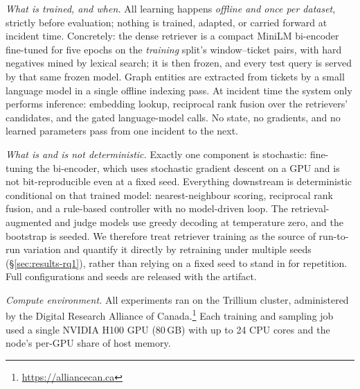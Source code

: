 \noindent\emph{What is trained, and when.} All learning happens \emph{offline and
once per dataset}, strictly before evaluation; nothing is trained, adapted, or
carried forward at incident time. Concretely: the dense retriever is a compact
MiniLM bi-encoder fine-tuned for five epochs on the \emph{training} split's
window--ticket pairs, with hard negatives mined by lexical search; it is then
frozen, and every test query is served by that same frozen model. Graph entities
are extracted from tickets by a small language model in a single offline indexing
pass. At incident time the system only performs inference: embedding lookup,
reciprocal rank fusion over the retrievers' candidates, and the gated
language-model calls. No state, no gradients, and no learned parameters pass from
one incident to the next.

\noindent\emph{What is and is not deterministic.} Exactly one component is
stochastic: fine-tuning the bi-encoder, which uses stochastic gradient descent on
a GPU and is not bit-reproducible even at a fixed seed. Everything downstream is
deterministic conditional on that trained model: nearest-neighbour scoring,
reciprocal rank fusion, and a rule-based controller with no model-driven loop.
The retrieval-augmented and judge models use greedy decoding at temperature zero,
and the bootstrap is seeded. We therefore treat retriever training as the source
of run-to-run variation and quantify it directly by retraining under multiple
seeds (\S\ref{sec:results-rq1}), rather than relying on a fixed seed to stand in
for repetition. Full configurations and seeds are released with the artifact.

\noindent\emph{Compute environment.} All experiments ran on the Trillium cluster, administered by the Digital
Research Alliance of Canada.\footnote{\url{https://alliancecan.ca}} Each training
and sampling job used a single NVIDIA H100 GPU (80\,GB) with up to 24 CPU cores
and the node's per-GPU share of host memory.
